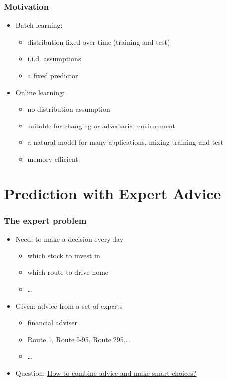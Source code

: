 \documentclass{beamer}
\begin{document}
\begin{frame}
\frametitle{Motivation}
\begin{itemize}
\item Batch learning:
\begin{itemize}
\item distribution fixed over time (training and test)
\item i.i.d. assumptions
\item a fixed predictor 
\end{itemize}
\pause
\item Online learning:
\begin{itemize}
\item no distribution assumption
\item suitable for changing or adversarial environment  
\item a natural model for many applications, mixing training and test 
\item memory efficient
\end{itemize}
\end{itemize}
\end{frame}




\section{Prediction with Expert Advice}
\begin{frame}
\frametitle{The expert problem}
\begin{itemize}
\item Need: to make a decision every day
	\begin{itemize}
	\item which stock to invest in
	\item which route to drive home
	\item \ldots
	\end{itemize}
\pause
\item Given: advice from a set of experts
	\begin{itemize}
	\item financial adviser
	\item Route 1, Route I-95, Route 295,\ldots
	\item \ldots
	\end{itemize}
\pause	
\item Question:
	\underline{How to combine advice and make smart choices?}
\end{itemize}

\end{frame}
\end{document}

